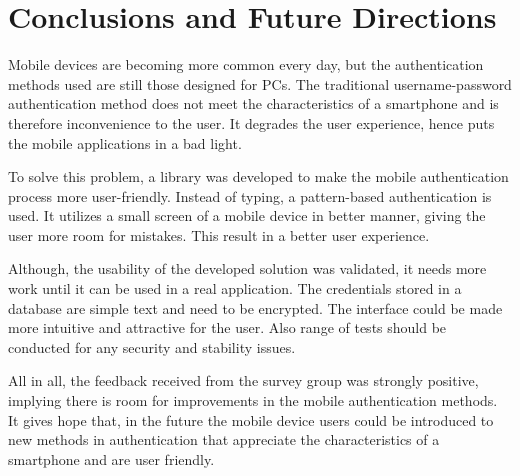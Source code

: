 
\chapter{Conclusions and Future Directions} %
Mobile devices are becoming more common every day, but the authentication methods used are still those designed for PCs. The traditional username-password authentication method does not meet the characteristics of a smartphone and is therefore inconvenience to the user. It degrades the user experience, hence puts the mobile applications in a bad light.

To solve this problem, a library was developed to make the mobile authentication process more user-friendly. Instead of typing, a pattern-based authentication is used. It utilizes a small screen of a mobile device in better manner, giving the user more room for mistakes. This result in a better user experience. 

Although, the usability of the developed solution was validated, it needs more work until it can be used in a real application. The credentials stored in a database are simple text and need to be encrypted. The interface could be made more intuitive and attractive for the user. Also range of tests should be conducted for any security and stability issues. 

All in all, the feedback received from the survey group was strongly positive, implying there is room for improvements in the mobile authentication methods. It gives hope that, in the future the mobile device users could be introduced to new methods in authentication that appreciate the characteristics of a smartphone and are user friendly.


\ifpdf
    \graphicspath{{X/figures/PNG/}{X/figures/PDF/}{X/figures/}}
\else
    \graphicspath{{X/figures/EPS/}{X/figures/}}
\fi









